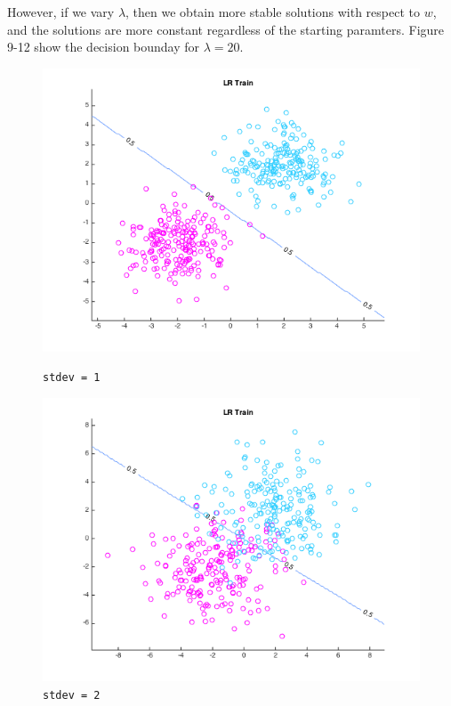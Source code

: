 \documentclass[10pt,letterpaper]{article}
\begin{document}
However, if we vary $\lambda$, then we obtain more stable solutions with respect to $w$, and the solutions are more constant regardless of the starting paramters. Figure 9-12 show the decision bounday for $\lambda = 20$.
\begin{figure}[!htb]
  \includegraphics[width=\linewidth]{figures/sd1t0.png}
  \caption{\texttt{stdev = 1}}\label{fig:gradDifQ}
\endminipage\hfill
{}
  \includegraphics[width=\linewidth]{figures/sd2t0.png}
  \caption{\texttt{stdev = 2}}\label{fig:gradDifN}
\endminipage\hfill
{}

\end{figure}
\end{document}
